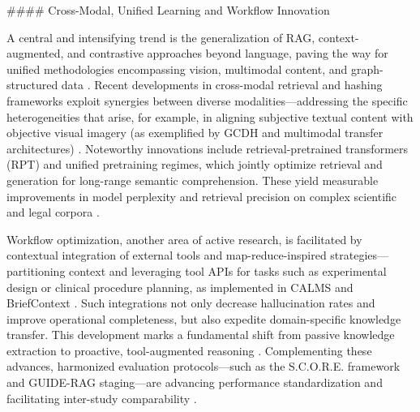 \documentclass[11pt]{article}
\begin{document}
#### Cross-Modal, Unified Learning and Workflow Innovation

A central and intensifying trend is the generalization of RAG, context-augmented, and contrastive approaches beyond language, paving the way for unified methodologies encompassing vision, multimodal content, and graph-structured data \cite{ref14,ref15,ref20,ref21,ref29,ref30,ref36,ref38,ref54,ref61}. Recent developments in cross-modal retrieval and hashing frameworks exploit synergies between diverse modalities—addressing the specific heterogeneities that arise, for example, in aligning subjective textual content with objective visual imagery (as exemplified by GCDH and multimodal transfer architectures) \cite{ref35,ref38}. Noteworthy innovations include retrieval-pretrained transformers (RPT) and unified pretraining regimes, which jointly optimize retrieval and generation for long-range semantic comprehension. These yield measurable improvements in model perplexity and retrieval precision on complex scientific and legal corpora \cite{ref29,ref31,ref54,ref61}.

Workflow optimization, another area of active research, is facilitated by contextual integration of external tools and map-reduce-inspired strategies—partitioning context and leveraging tool APIs for tasks such as experimental design or clinical procedure planning, as implemented in CALMS and BriefContext \cite{ref5,ref24,ref48}. Such integrations not only decrease hallucination rates and improve operational completeness, but also expedite domain-specific knowledge transfer. This development marks a fundamental shift from passive knowledge extraction to proactive, tool-augmented reasoning \cite{ref28,ref48}. Complementing these advances, harmonized evaluation protocols—such as the S.C.O.R.E. framework and GUIDE-RAG staging—are advancing performance standardization and facilitating inter-study comparability \cite{ref8,ref21,ref28}.
\end{document}
